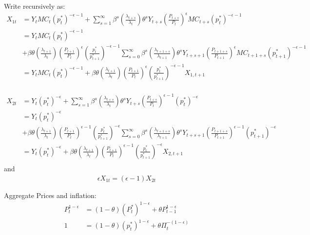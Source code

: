 \documentclass[11pt]{article}
\begin{document}
Write recursively as:
\begin{align*}
	X_{1t} & =  Y_t MC_{t} (p_t^*)^{-\epsilon-1} + \sum_{s=1}^{\infty}\beta^s \left(\frac{\lambda_{t+s}}{\lambda_t}\right)\theta^{s}Y_{t+s} \left(\frac{P_{t+s}}{P_t}\right)^{\epsilon} MC_{t+s} (p_t^*)^{-\epsilon-1} \\ 
	& = Y_{t} MC_{t} (p_t^*)^{-\epsilon-1} \\
	&+ \beta\theta \left(\frac{\lambda_{t+1}}{\lambda_t}\right)  \left(\frac{P_{t+1}}{P_{t}}\right)^{\epsilon} \left(\frac{p_t^*}{p_{t+1}^*}\right)^{-\epsilon-1}  \sum_{s=0}^{\infty}\beta^s \left(\frac{\lambda_{t+1+s}}{\lambda_{t+1}}\right)\theta^{s} Y_{t+s+1} \left(\frac{P_{t+1+s}}{P_{t+1}}\right)^{\epsilon} MC_{t+1+s} (p_{t+1}^*)^{-\epsilon-1} \\ 
	& = Y_{t} MC_{t} (p_t^*)^{-\epsilon-1} + \beta\theta  \left(\frac{\lambda_{t+1}}{\lambda_{t}}\right)\left(\frac{P_{t+1}}{P_{t}}\right)^{\epsilon} \left(\frac{p_t^*}{p_{t+1}^*}\right)^{-\epsilon-1}  X_{1,t+1} \\ 
\end{align*}

\begin{align*}
	X_{2t} & =  Y_t  (p_t^*)^{-\epsilon} + \sum_{s=1}^{\infty} \beta^s\left(\frac{\lambda_{t+s}}{\lambda_t}\right)\theta^{s}Y_{t+s}\left(\frac{P_{t+s}}{P_t}\right)^{\epsilon-1}  (p_t^*)^{-\epsilon}  \\ 
	& =  Y_{t} (p_t^*)^{-\epsilon} \\
	& + \beta\theta \left(\frac{\lambda_{t+1}}{\lambda_t}\right)  \left(\frac{P_{t+1}}{P_{t}}\right)^{\epsilon-1} \left(\frac{p_t^*}{p_{t+1}^*}\right)^{-\epsilon}  \sum_{s=0}^{\infty} \beta^s\left(\frac{\lambda_{t+1+s}}{\lambda_{t+1}}\right)\theta^{s} Y_{t+s+1} \left(\frac{P_{t+1+s}}{P_{t+1}}\right)^{\epsilon-1} (p_{t+1}^*)^{-\epsilon} \\ 
	& =  Y_{t} (p_t^*)^{-\epsilon} + \beta\theta  \left(\frac{\lambda_{t+1}}{\lambda_{t}}\right)\left(\frac{P_{t+1}}{P_{t}}\right)^{\epsilon-1} \left(\frac{p_t^*}{p_{t+1}^*}\right)^{-\epsilon}  X_{2,t+1} \\ 
\end{align*}
and
\begin{align*}
	\epsilon  X_{1t}=(\epsilon-1)X_{2t}
\end{align*}


Aggregate Prices and inflation:
\begin{align*}
	P_t^{1-\epsilon} &= (1-\theta)(P_{t}^*)^{1-\epsilon} + \theta P_{t-1}^{1-\epsilon} \\
	1 &= (1-\theta)(p_{t}^*)^{1-\epsilon} + \theta \Pi_{t}^{-(1-\epsilon)} \\
\end{align*}
\end{document}
